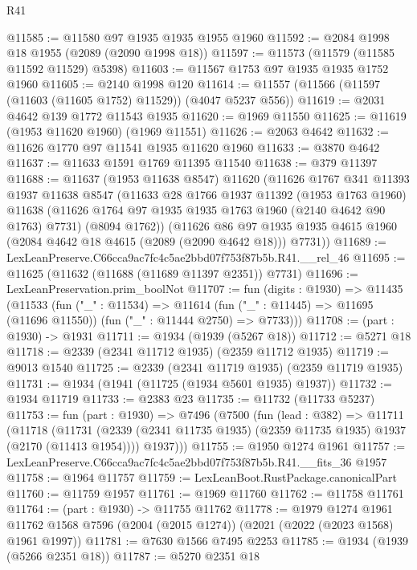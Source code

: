 \begin{lexlean}{R41}
\begin{coremodule}
@11585 := @11580 @97 @1935 @1935 @1955 @1960
@11592 := @2084 @1998 @18 @1955 (@2089 (@2090 @1998 @18))
@11597 := @11573 (@11579 (@11585 @11592 @11529) @5398)
@11603 := @11567 @1753 @97 @1935 @1935 @1752 @1960
@11605 := @2140 @1998 @120
@11614 := @11557 (@11566 (@11597 (@11603 (@11605 @1752) @11529)) (@4047 @5237 @556))
@11619 := @2031 @4642 @139 @1772 @11543 @1935
@11620 := @1969 @11550
@11625 := @11619 (@1953 @11620 @1960) (@1969 @11551)
@11626 := @2063 @4642
@11632 := @11626 @1770 @97 @11541 @1935 @11620 @1960
@11633 := @3870 @4642
@11637 := @11633 @1591 @1769 @11395 @11540
@11638 := @379 @11397
@11688 := @11637
    (@1953 @11638 @8547)
    @11620
    (@11626
      @1767
      @341
      @11393
      @1937
      @11638
      @8547
      (@11633
        @28
        @1766
        @1937
        @11392
        (@1953 @1763 @1960)
        @11638
        (@11626 @1764 @97 @1935 @1935 @1763 @1960 (@2140 @4642 @90 @1763) @7731)
        (@8094 @1762))
      (@11626
        @86
        @97
        @1935
        @1935
        @4615
        @1960
        (@2084 @4642 @18 @4615 (@2089 (@2090 @4642 @18)))
        @7731))
@11689 := LexLeanPreserve.C66cca9ac7fc4c5ae2bbd07f753f87b5b.R41.__rel_46
@11695 := @11625 (@11632 (@11688 (@11689 @11397 @2351)) @7731)
@11696 := LexLeanPreservation.prim_boolNot
@11707 := fun (digits : @1930) =>
  @11435
    (@11533
      (fun ("_" : @11534) =>
      @11614 (fun ("_" : @11445) => @11695 (@11696 @11550)) (fun ("_" : @11444 @2750) => @7733)))
@11708 := (part : @1930) -> @1931
@11711 := @1934 (@1939 (@5267 @18))
@11712 := @5271 @18
@11718 := @2339 (@2341 @11712 @1935) (@2359 @11712 @1935)
@11719 := @9013 @1540
@11725 := @2339 (@2341 @11719 @1935) (@2359 @11719 @1935)
@11731 := @1934 (@1941 (@11725 (@1934 @5601 @1935) @1937))
@11732 := @1934 @11719
@11733 := @2383 @23
@11735 := @11732 (@11733 @5237)
@11753 := fun (part : @1930) =>
  @7496
    (@7500
      (fun (lead : @382) =>
      @11711
        (@11718
          (@11731 (@2339 (@2341 @11735 @1935) (@2359 @11735 @1935) @1937 (@2170 (@11413 @1954))))
          @1937)))
@11755 := @1950 @1274 @1961
@11757 := LexLeanPreserve.C66cca9ac7fc4c5ae2bbd07f753f87b5b.R41.__fits_36 @1957
@11758 := @1964 @11757
@11759 := LexLeanBoot.RustPackage.canonicalPart
@11760 := @11759 @1957
@11761 := @1969 @11760
@11762 := @11758 @11761
@11764 := (part : @1930) -> @11755 @11762
@11778 := @1979
    @1274
    @1961
    @11762
    @1568
    @7596
    (@2004 (@2015 @1274))
    (@2021 (@2022 (@2023 @1568) @1961 @1997))
@11781 := @7630 @1566 @7495 @2253
@11785 := @1934 (@1939 (@5266 @2351 @18))
@11787 := @5270 @2351 @18

\end{coremodule}
\end{lexlean}
